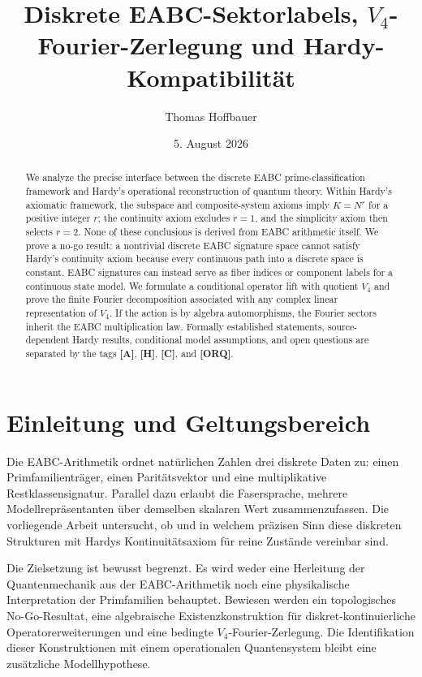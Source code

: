 \documentclass[11pt,a4paper,reqno]{amsart}
\title[EABC-Sektoren, Fourier-Zerlegung und Hardy]{Diskrete EABC-Sektorlabels, $V_4$-Fourier-Zerlegung und Hardy-Kompatibilität}
\author{Thomas Hoffbauer}
\date{5. August 2026}
\theoremstyle{definition}
\theoremstyle{remark}
\begin{document}
\begin{abstract}
We analyze the precise interface between the discrete EABC prime-classification framework and Hardy's operational reconstruction of quantum theory. Within Hardy's axiomatic framework, the subspace and composite-system axioms imply $K=N^r$ for a positive integer $r$; the continuity axiom excludes $r=1$, and the simplicity axiom then selects $r=2$. None of these conclusions is derived from EABC arithmetic itself. We prove a no-go result: a nontrivial discrete EABC signature space cannot satisfy Hardy's continuity axiom because every continuous path into a discrete space is constant. EABC signatures can instead serve as fiber indices or component labels for a continuous state model. We formulate a conditional operator lift with quotient $V_4$ and prove the finite Fourier decomposition associated with any complex linear representation of $V_4$. If the action is by algebra automorphisms, the Fourier sectors inherit the EABC multiplication law. Formally established statements, source-dependent Hardy results, conditional model assumptions, and open questions are separated by the tags \textbf{[A]}, \textbf{[H]}, \textbf{[C]}, and \textbf{[ORQ]}.
\end{abstract}

\maketitle

\section{Einleitung und Geltungsbereich}

Die EABC-Arithmetik ordnet natürlichen Zahlen drei diskrete Daten zu: einen Primfamilienträger, einen Paritätsvektor und eine multiplikative Restklassensignatur. Parallel dazu erlaubt die Fasersprache, mehrere Modellrepräsentanten über demselben skalaren Wert zusammenzufassen. Die vorliegende Arbeit untersucht, ob und in welchem präzisen Sinn diese diskreten Strukturen mit Hardys Kontinuitätsaxiom für reine Zustände vereinbar sind.

Die Zielsetzung ist bewusst begrenzt. Es wird weder eine Herleitung der Quantenmechanik aus der EABC-Arithmetik noch eine physikalische Interpretation der Primfamilien behauptet. Bewiesen werden ein topologisches No-Go-Resultat, eine algebraische Existenzkonstruktion für diskret-kontinuierliche Operatorerweiterungen und eine bedingte $V_4$-Fourier-Zerlegung. Die Identifikation dieser Konstruktionen mit einem operationalen Quantensystem bleibt eine zusätzliche Modellhypothese.
\end{document}
